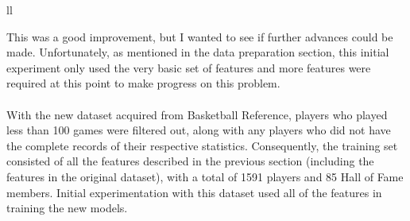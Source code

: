 \documentclass[paper=a4, fontsize=11pt]{scrartcl} %
\numberwithin{equation}{section} %
\numberwithin{figure}{section} %
\numberwithin{table}{section} %
\begin{document}
\begin{table}[thb]
\centering
\caption{\label{cost_sensitive_confusion}Confusion Matrix}
\begin{tabular}{ll}
\end{tabular}
\end{table}

This was a good improvement, but I wanted to see if further advances could be made. Unfortunately, as mentioned in the data preparation section, this initial experiment only used the very basic set of features and more features were required at this point to make progress on this problem.\\
\\
With the new dataset acquired from Basketball Reference, players who played less than 100 games were filtered out, along with any players who did not have the complete records of their respective statistics. Consequently, the training set consisted of all the features described in the previous section (including the features in the original dataset), with a total of 1591 players and 85 Hall of Fame members. Initial experimentation with this dataset used all of the features in training the new models.
\end{document}
